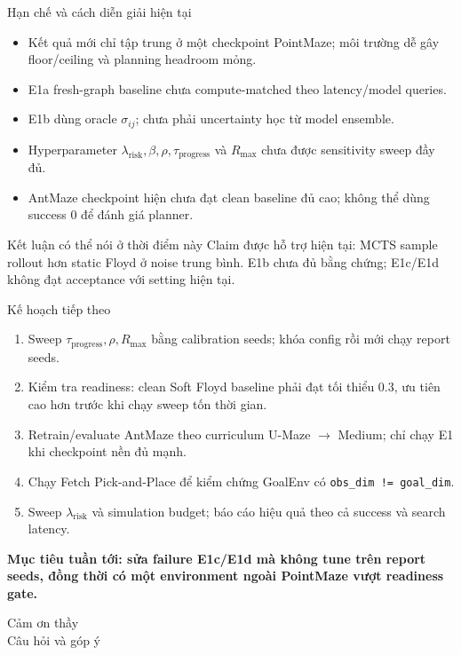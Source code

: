 \documentclass[aspectratio=169,10pt]{beamer}
\newcommand{\code}[1]{\texttt{\small #1}}
\begin{document}
\begin{frame}{Hạn chế và cách diễn giải hiện tại}
  \begin{itemize}
    \item Kết quả mới chỉ tập trung ở một checkpoint PointMaze; môi trường dễ gây
          floor/ceiling và planning headroom mỏng.
    \item E1a fresh-graph baseline chưa compute-matched theo latency/model queries.
    \item E1b dùng oracle $\sigma_{ij}$; chưa phải uncertainty học từ model ensemble.
    \item Hyperparameter $\lambda_{\mathrm{risk}},\beta,\rho,\tau_{\mathrm{progress}}$
          và $R_{\max}$ chưa được sensitivity sweep đầy đủ.
    \item AntMaze checkpoint hiện chưa đạt clean baseline đủ cao; không thể dùng
          success 0 để đánh giá planner.
  \end{itemize}

  \begin{block}{Kết luận có thể nói ở thời điểm này}
    Claim được hỗ trợ hiện tại: MCTS sample rollout hơn static Floyd ở noise trung
    bình. E1b chưa đủ bằng chứng; E1c/E1d không đạt acceptance với setting hiện tại.
  \end{block}
\end{frame}

\begin{frame}{Kế hoạch tiếp theo}
  \begin{enumerate}
    \item Sweep $\tau_{\mathrm{progress}},\rho,R_{\max}$ bằng calibration seeds;
          khóa config rồi mới chạy report seeds.
    \item Kiểm tra readiness: clean Soft Floyd baseline phải đạt tối thiểu 0.3,
          ưu tiên cao hơn trước khi chạy sweep tốn thời gian.
    \item Retrain/evaluate AntMaze theo curriculum U-Maze $\rightarrow$ Medium;
          chỉ chạy E1 khi checkpoint nền đủ mạnh.
    \item Chạy Fetch Pick-and-Place để kiểm chứng GoalEnv có
          \code{obs\_dim != goal\_dim}.
    \item Sweep $\lambda_{\mathrm{risk}}$ và simulation budget;
          báo cáo hiệu quả theo cả success và search latency.
  \end{enumerate}

  \vfill
  \centering
  \textbf{Mục tiêu tuần tới: sửa failure E1c/E1d mà không tune trên report seeds,
  đồng thời có một environment ngoài PointMaze vượt readiness gate.}
\end{frame}

\begin{frame}[plain]
  \centering
  \Huge Cảm ơn thầy\\[0.6em]
  \large Câu hỏi và góp ý
\end{frame}
\end{document}
